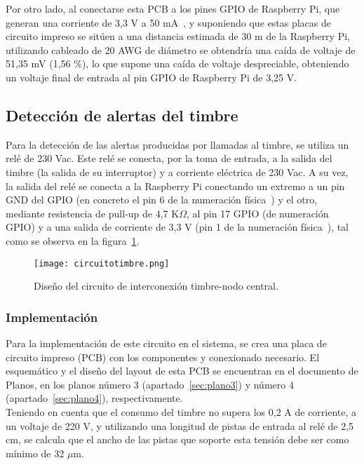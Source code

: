         Por otro lado, al conectarse esta PCB a los pines GPIO de Raspberry Pi, que generan una corriente de 3,3 V a 50 mA~\cite{raspberry_pinout}, y suponiendo que estas placas de circuito impreso se sitúen a una distancia estimada de 30 m de la Raspberry Pi, utilizando cableado de 20 AWG de diámetro se obtendría una caída de voltaje de 51,35 mV (1,56 \%), lo que supone una caída de voltaje despreciable, obteniendo un voltaje final de entrada al pin GPIO de Raspberry Pi de 3,25 V.

    \subsection{Detección de alertas del timbre}

    Para la detección de las alertas producidas por llamadas al timbre, se utiliza un relé de 230 Vac. Este relé se conecta, por la toma de entrada, a la salida del timbre (la salida de su interruptor) y a corriente eléctrica de 230 Vac. A su vez, la salida del relé se conecta a la Raspberry Pi conectando un extremo a un pin GND del GPIO (en concreto el pin 6 de la numeración física~\cite{raspberrypigpio}) y el otro, mediante resistencia de pull-up de 4,7 K$\Omega$, al pin 17 GPIO (de numeración GPIO) y a una salida de corriente de 3,3 V (pin 1 de la numeración física~\cite{raspberrypigpio}), tal como se observa en la figura~\ref{circuitotimbre}.\\

    \begin{figure}[H]
      \centering
        \texttt{[image: circuitotimbre.png]}
      \caption{Diseño del circuito de interconexión timbre-nodo central.}
      \label{circuitotimbre}
    \end{figure}
    
        \subsubsection{Implementación}

        Para la implementación de este circuito en el sistema, se crea una placa de circuito impreso (PCB) con los componentes y conexionado necesario. El esquemático y el diseño del layout de esta PCB se encuentran en el documento de Planos, en los planos número 3 (apartado~\ref{sec:plano3}) y número 4 (apartado~\ref{sec:plano4}), respectivamente. \\
        
        Teniendo en cuenta que el consumo del timbre no supera los 0,2 A de corriente, a un voltaje de 220 V, y utilizando una longitud de pistas de entrada al relé de 2,5 cm, se calcula que el ancho de las pistas que soporte esta tensión debe ser como mínimo de 32 $\mu$m. \\
        
